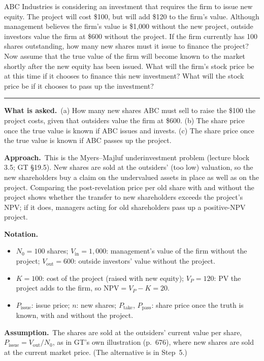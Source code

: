 \documentclass[11pt,a4paper]{article}
\newcommand{\notation}{\par\noindent\textbf{Notation.}}
\newcommand{\assume}{\par\smallskip\noindent\textbf{Assumption.}~}
\newcommand{\asked}{\par\medskip\noindent\textbf{What is asked.}~}
\newcommand{\approach}{\par\smallskip\noindent\textbf{Approach.}~}
\newcommand{\stmtend}{\par\endgroup\nopagebreak\noindent\rule{\linewidth}{0.4pt}\par\medskip}
\begin{document}
ABC Industries is considering an investment that requires the firm to issue new equity. The project
will cost \$100, but will add \$120 to the firm's value. Although management believes the firm's
value is \$1,000 without the new project, outside investors value the firm at \$600 without the
project. If the firm currently has 100 shares outstanding, how many new shares must it issue to
finance the project? Now assume that the true value of the firm will become known to the market
shortly after the new equity has been issued. What will the firm's stock price be at this time if it
chooses to finance this new investment? What will the stock price be if it chooses to pass up the
investment?
\stmtend

\asked (a) How many new shares ABC must sell to raise the \$100 the project costs, given that outsiders value the firm at \$600. (b) The share price once the true value is known if ABC issues and invests. (c) The share price once the true value is known if ABC passes up the project.

\approach This is the Myers--Majluf underinvestment problem (lecture block 3.5; GT \S19.5). New shares are sold at the outsiders' (too low) valuation, so the new shareholders buy a claim on the undervalued assets in place as well as on the project. Comparing the post-revelation price per old share with and without the project shows whether the transfer to new shareholders exceeds the project's NPV; if it does, managers acting for old shareholders pass up a positive-NPV project.

\notation
\begin{itemize}
  \item $N_0=100$ shares; $V_{\text{in}}=1{,}000$: management's value of the firm without the project; $V_{\text{out}}=600$: outside investors' value without the project.
  \item $K=100$: cost of the project (raised with new equity); $V_P=120$: PV the project adds to the firm, so $\text{NPV}=V_P-K=20$.
  \item $P_{\text{issue}}$: issue price; $n$: new shares; $P_{\text{take}}$, $P_{\text{pass}}$: share price once the truth is known, with and without the project.
\end{itemize}

\assume The shares are sold at the outsiders' current value per share, $P_{\text{issue}}=V_{\text{out}}/N_0$, as in GT's own illustration (p.~676), where new shares are sold at the current market price. (The alternative is in Step~5.)
\end{document}
